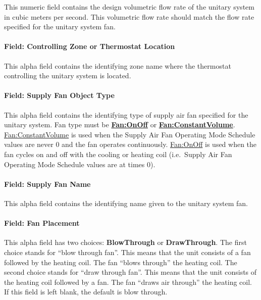 This numeric field contains the design volumetric flow rate of the unitary system in cubic meters per second. This volumetric flow rate should match the flow rate specified for the unitary system fan.

\paragraph{Field: Controlling Zone or Thermostat Location}\label{field-controlling-zone-or-thermostat-location-6}

This alpha field contains the identifying zone name where the thermostat controlling the unitary system is located.

\paragraph{Field: Supply Fan Object Type}\label{field-supply-fan-object-type-4}

This alpha field contains the identifying type of supply air fan specified for the unitary system. Fan type must be \textbf{\hyperref[fanonoff]{Fan:OnOff}} or \textbf{\hyperref[fanconstantvolume]{Fan:ConstantVolume}}. \hyperref[fanconstantvolume]{Fan:ConstantVolume} is used when the Supply Air Fan Operating Mode Schedule values are never 0 and the fan operates continuously. \hyperref[fanonoff]{Fan:OnOff} is used when the fan cycles on and off with the cooling or heating coil (i.e.~Supply Air Fan Operating Mode Schedule values are at times 0).

\paragraph{Field: Supply Fan Name}\label{field-supply-fan-name-4}

This alpha field contains the identifying name given to the unitary system fan.

\paragraph{Field: Fan Placement}\label{field-fan-placement-5}

This alpha field has two choices: \textbf{BlowThrough} or \textbf{DrawThrough}. The first choice stands for ``blow through fan''. This means that the unit consists of a fan followed by the heating coil. The fan ``blows through'' the heating coil. The second choice stands for ``draw through fan''. This means that the unit consists of the heating coil followed by a fan. The fan ``draws air through'' the heating coil. If this field is left blank, the default is blow through.

